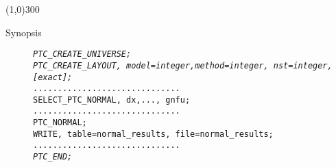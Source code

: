\line(1,0){300}

\begin{description}
	\item[Synopsis]
	\text{ \\}
	 \textit{
\texttt{PTC\_CREATE\_UNIVERSE;}}\\
\textit{\texttt{PTC\_CREATE\_LAYOUT, model=integer,method=integer,  nst=integer, [exact];}}\\
\texttt{..............................\\
         SELECT\_PTC\_NORMAL, dx,..., gnfu;}\\
\texttt{..............................}\\
\texttt{PTC\_NORMAL;\\
         WRITE, table=normal\_results, file=normal\_results;}\\
\texttt{..............................}\\
\textit{\texttt{PTC\_END; }}\\
\end{description}

